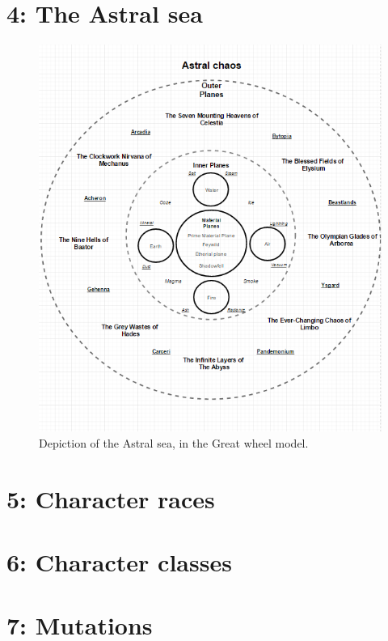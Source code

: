 \documentclass[a4paper]{article}
\begin{document}
\section{4: The Astral sea}
\begin{figure}[h]
\begin{center}
\includegraphics[scale=0.8]{TheAstralSea}
\caption{Depiction of the Astral sea, in the Great wheel model.}\label{TheAstralSea}
\end{center}
\end{figure}

\section{5: Character races}

\section{6: Character classes}

\section{7: Mutations}
\end{document}
